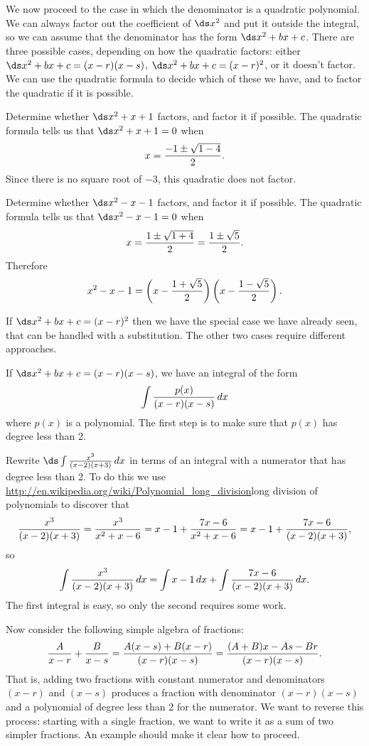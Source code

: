 We now proceed to the case in which the denominator is a quadratic
polynomial.  We can always factor out the coefficient of $\ds x^2$ and put
it outside the integral, so we can assume that the denominator has the
form $\ds x^2+bx+c$.  There are three possible cases, depending on how
the quadratic factors: either $\ds x^2+bx+c=(x-r)(x-s)$,
$\ds x^2+bx+c=(x-r)^2$, or it doesn't factor. We can use the quadratic
formula to decide which of these we have, and to factor the quadratic
if it is possible.

\begin{example}
Determine whether $\ds x^2+x+1$ factors, and factor it if possible.
The quadratic formula tells us that $\ds x^2+x+1=0$ when
$$x={-1\pm\sqrt{1-4}\over 2}.$$
Since there is no square root of $-3$, this quadratic does not factor.
\end{example}

\begin{example}
Determine whether $\ds x^2-x-1$ factors, and factor it if possible.
The quadratic formula tells us that $\ds x^2-x-1=0$ when
$$x={1\pm\sqrt{1+4}\over 2}={1\pm\sqrt{5}\over2}.$$
Therefore
$$
  x^2-x-1=\left(x-{1+\sqrt{5}\over2}\right)\left(x-{1-\sqrt{5}\over2}\right).
$$
\vskip-10pt\end{example}

If $\ds x^2+bx+c=(x-r)^2$ then we have the special case we have already
seen, that can be handled with a substitution. The other two cases
require different approaches.

If  $\ds x^2+bx+c=(x-r)(x-s)$, we have an integral of the form
$$\int{p(x)\over (x-r)(x-s)}\,dx$$
where $p(x)$ is a polynomial. The first step is to make sure that
$p(x)$ has degree less than 2.

\begin{example}
Rewrite $\ds\int {x^3\over (x-2)(x+3)}\,dx$ in terms of an integral
with a numerator that has degree less than 2. To do this we use 
\url{http://en.wikipedia.org/wiki/Polynomial_long_division}long
division of polynomials\endurl{} to 
discover that
$$
  {x^3\over (x-2)(x+3)}={x^3\over x^2+x-6}=x-1+{7x-6\over x^2+x-6}=
  x-1+{7x-6\over (x-2)(x+3)},
$$
so 
$$
  \int {x^3\over (x-2)(x+3)}\,dx=\int x-1\,dx +\int {7x-6\over
  (x-2)(x+3)}\,dx.
$$
The first integral is easy, so only the second requires some work.
\end{example}

Now consider the following simple algebra of fractions:
$$
  {A\over x-r}+{B\over x-s}={A(x-s)+B(x-r)\over (x-r)(x-s)}=
  {(A+B)x-As-Br\over (x-r)(x-s)}.
$$
That is, adding two fractions with constant numerator and denominators
$(x-r)$ and $(x-s)$ produces a fraction with denominator $(x-r)(x-s)$
and a polynomial of degree less than 2 for the numerator. We want to
reverse this process: starting with a single fraction, we want to
write it as a sum of two simpler fractions. An example should make it
clear how to proceed.

